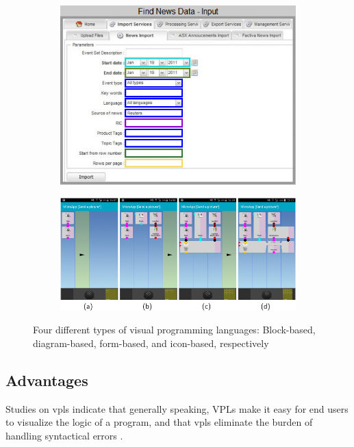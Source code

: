\begin{figure}
\begin{subfigure}[c]{0.45\linewidth}
  \includegraphics[width=\linewidth]{form-based.png}
  \caption{}\label{fig:vpl-types:3}
\end{subfigure}%
\qquad %
\begin{subfigure}[d]{0.45\linewidth}
  \centering
  \graphicspath{{../../assets/images/background/vpl/}}
  \includegraphics[width=\linewidth]{icon-based.jpg}
  \caption{}\label{fig:vpl-types:4}
\end{subfigure}%
\caption[Types of \ac{vpl}s]{Four different types of visual programming languages: Block-based, diagram-based, form-based, and icon-based, respectively}%
\label{fig:vpl-types}
\end{figure}

\subsection{Advantages}

Studies on \ac{vpl}s indicate that generally speaking, VPLs make it easy for end users to visualize the logic of a program, and that vpls eliminate the burden of handling syntactical errors \cite{kuhail_characterizing_2021}.

